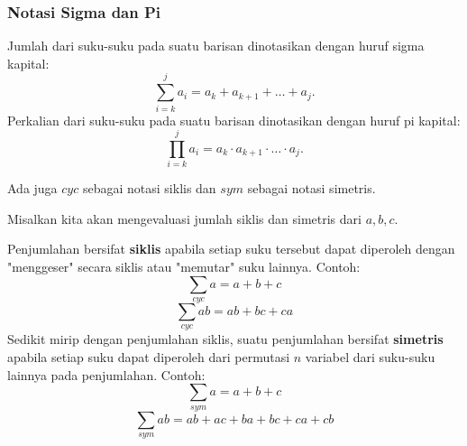 \subsubsection{Notasi Sigma dan Pi}
Jumlah dari suku-suku pada suatu barisan dinotasikan dengan huruf sigma kapital:
$$\sum_{i=k}^{j} a_i = a_k+a_{k+1}+\dots+a_j.$$
Perkalian dari suku-suku pada suatu barisan dinotasikan dengan huruf pi kapital:
$$\prod_{i=k}^{j} a_i = a_k \cdot a_{k+1}\cdot \ldots \cdot a_j.$$

Ada juga $cyc$ sebagai notasi siklis dan $sym$ sebagai notasi simetris.

Misalkan kita akan mengevaluasi jumlah siklis dan simetris dari $a,b,c$.

Penjumlahan bersifat \textbf{siklis} apabila setiap suku tersebut dapat diperoleh dengan "menggeser" secara siklis atau "memutar" suku lainnya.
Contoh: $$\sum_{cyc} a = a+b+c$$
     $$\sum_{cyc} ab = ab+ bc + ca$$
Sedikit mirip dengan penjumlahan siklis, suatu penjumlahan bersifat \textbf{simetris} apabila setiap suku dapat diperoleh dari permutasi $n$ variabel dari suku-suku lainnya pada penjumlahan. Contoh: 
    $$\sum_{sym} a = a+b+c$$
    $$\sum_{sym} ab = ab+ ac + ba + bc + ca + cb$$